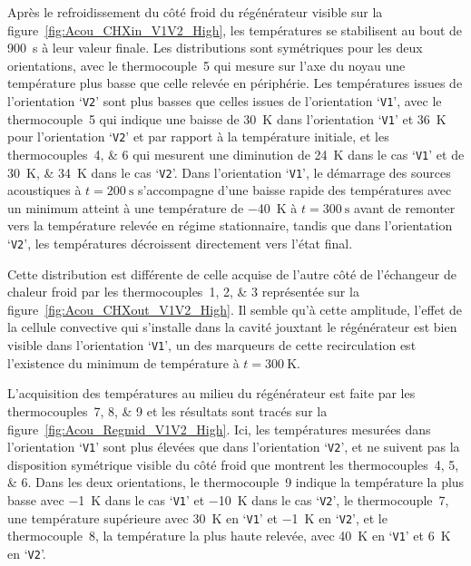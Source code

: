 Après le refroidissement du côté froid du régénérateur visible sur la figure~\ref{fig:Acou_CHXin_V1V2_High}, les températures se stabilisent au bout de \qty{900}{\second} à leur valeur finale. Les distributions sont symétriques pour les deux orientations, avec le thermocouple~\num{5} qui mesure sur l'axe du noyau une température plus basse que celle relevée en périphérie. Les températures issues de l'orientation `\texttt{V2}' sont plus basses que celles issues de l'orientation `\texttt{V1}', avec le thermocouple~\num{5} qui indique une baisse de \qty{30}{\kelvin} dans l'orientation `\texttt{V1}' et \qty{36}{\kelvin} pour l'orientation `\texttt{V2}' et par rapport à la température initiale, et les thermocouples~\numlist{4;6} qui mesurent une diminution de \qty{24}{\kelvin} dans le cas `\texttt{V1}' et de \qtylist{30;34}{\kelvin} dans le cas `\texttt{V2}'. Dans l'orientation `\texttt{V1}', le démarrage des sources acoustiques à $t=\qty{200}{\second}$ s'accompagne d'une baisse rapide des températures avec un minimum atteint à une température de \qty{-40}{\kelvin} à $t=\qty{300}{\second}$ avant de remonter vers la température relevée en régime stationnaire, tandis que dans l'orientation `\texttt{V2}', les températures décroissent directement vers l'état final. 

Cette distribution est différente de celle acquise de l'autre côté de l'échangeur de chaleur froid par les thermocouples~\numlist{1;2;3} représentée sur la figure~\ref{fig:Acou_CHXout_V1V2_High}. Il semble qu'à cette amplitude, l'effet de la cellule convective qui s'installe dans la cavité jouxtant le régénérateur est bien visible dans l'orientation `\texttt{V1}', un des marqueurs de cette recirculation est l'existence du minimum de température à $t=\qty{300}{\kelvin}$.\medskip

L'acquisition des températures au milieu du régénérateur est faite par les thermocouples~\numlist{7;8;9} et les résultats sont tracés sur la figure~\ref{fig:Acou_Regmid_V1V2_High}. Ici, les températures mesurées dans l'orientation `\texttt{V1}' sont plus élevées que dans l'orientation `\texttt{V2}', et ne suivent pas la disposition symétrique visible du côté froid que montrent les thermocouples~\numlist{4;5;6}. Dans les deux orientations, le thermocouple~\num{9} indique la température la plus basse avec \qty{-1}{\kelvin} dans le cas `\texttt{V1}' et \qty{-10}{\kelvin} dans le cas `\texttt{V2}', le thermocouple~\num{7}, une température supérieure avec \qty{30}{\kelvin} en `\texttt{V1}' et \qty{-1}{\kelvin} en `\texttt{V2}', et le thermocouple~\num{8}, la température la plus haute relevée, avec \qty{40}{\kelvin} en `\texttt{V1}' et \qty{6}{\kelvin} en `\texttt{V2}'.\medskip

